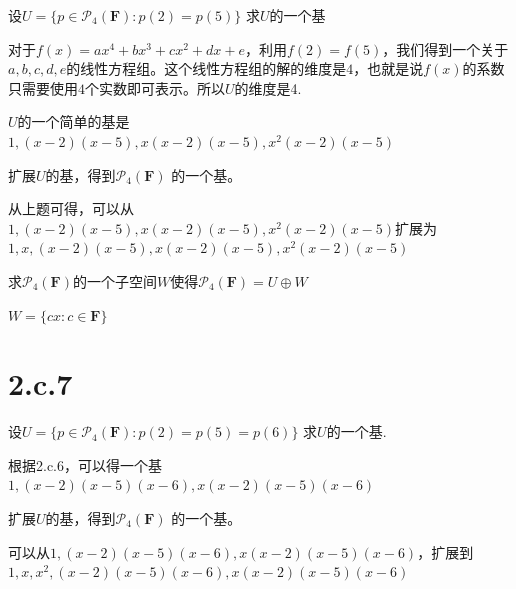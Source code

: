 \documentclass[10pt,a4paper,UTF8]{article}
\begin{document}
\begin{problem}
设\(U=\{p\in \mathcal{P}_{4}( \mathbf{F}):p(2)=p(5)\}\) 求\(U\)的一个基
\end{problem}

\begin{answer}
对于\(f(x) = ax^{4} + bx^{3} + cx^{2} + dx +e\)，利用\(f(2) = f(5)\)，我们得到一个关于\(a,b,c,d,e\)的线性方程组。这个线性方程组的解的维度是\(4\)，也就是说\(f(x)\)的系数只需要使用\(4\)个实数即可表示。所以\(U\)的维度是4.

\(U\)的一个简单的基是\(1, (x-2)(x-5), x(x-2)(x-5),x^{2}(x-2)(x-5)\)
\end{answer}


\begin{problem}
扩展\(U\)的基，得到\(\mathcal{P}_{4}( \mathbf{F})\) 的一个基。
\end{problem}

\begin{answer}
从上题可得，可以从\(1, (x-2)(x-5), x(x-2)(x-5),x^{2}(x-2)(x-5)\)扩展为\(1,x,(x-2)(x-5), x(x-2)(x-5),x^{2}(x-2)(x-5)\)
\end{answer}

\begin{problem}
求\(\mathcal{P}_{4}(\mathbf{F})\)的一个子空间\(W\)使得\(\mathcal{P}_{4}( \mathbf{F}) = U\oplus W\)
\end{problem}

\begin{answer}
\(W = \{cx:c\in \mathbf{F}\}\)
\end{answer}
\section{2.c.7}
\label{sec:orga14319e}


\begin{problem}
设\(U=\{p\in \mathcal{P}_{4}( \mathbf{F}):p(2)=p(5)=p(6)\}\) 求\(U\)的一个基.
\end{problem}

\begin{answer}
根据2.c.6，可以得一个基\(1,(x-2)(x-5)(x-6),x(x-2)(x-5)(x-6)\)
\end{answer}


\begin{problem}
扩展\(U\)的基，得到\(\mathcal{P}_{4}( \mathbf{F})\) 的一个基。
\end{problem}

\begin{answer}
可以从\(1,(x-2)(x-5)(x-6),x(x-2)(x-5)(x-6)\)，扩展到\(1,x,x^{2},(x-2)(x-5)(x-6),x(x-2)(x-5)(x-6)\)
\end{answer}
\end{document}

